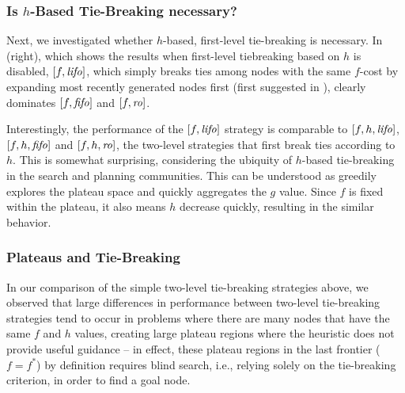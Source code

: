 \subsubsection{Is $h$-Based Tie-Breaking necessary?}

Next, we investigated whether $h$-based, first-level tie-breaking is necessary.
In  (right), which shows the results when  first-level
tiebreaking based on $h$ is disabled, $[f, \mbox{\textit{lifo}}]$, which simply breaks ties among nodes with the same $f$-cost by expanding most recently generated nodes first (first suggested in \cite{korf1985depth}),
clearly dominates $[f, \mbox{\textit{fifo}}]$ and $[f, \mbox{\textit{ro}}]$.

Interestingly, the performance of the $[f, \mbox{\textit{lifo}}]$ strategy
is comparable to $[f,h,\mbox{\textit{lifo}}]$, $[f,h,\mbox{\textit{fifo}}]$ and $[f,h,\mbox{\textit{ro}}]$, the two-level strategies that first break ties according to $h$.
This is somewhat surprising, considering the ubiquity of $h$-based tie-breaking in the search and planning communities.
% 
This can be understood as \lifo greedily explores the plateau space
and quickly aggregates the $g$ value. Since $f$ is fixed within the
plateau, it also means $h$ decrease quickly, resulting in the similar behavior.



\subsubsection{Plateaus and Tie-Breaking}

In our comparison of the simple two-level tie-breaking strategies
above, we observed that large differences in performance between
two-level tie-breaking strategies tend to occur in problems where
there are many nodes that have the same $f$ and $h$ values, creating
large plateau regions where the heuristic does not provide
useful guidance -- in effect, these plateau regions in the last
frontier ($f=f^*$) by definition requires blind search, i.e., 
relying solely on the tie-breaking criterion, in order to
find a goal node.

